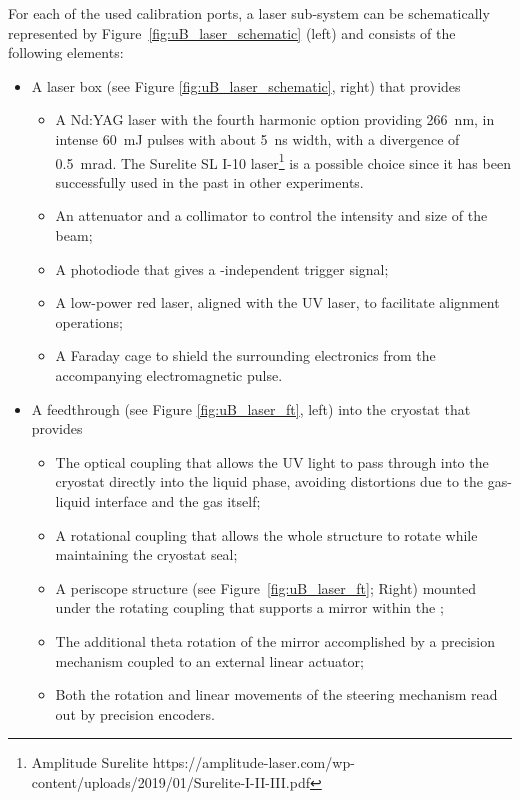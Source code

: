 For each of %
the used calibration ports, a laser sub-system can be schematically represented by Figure~\ref{fig:uB_laser_schematic} (left) and consists of the following elements:
\begin{itemize}
    \item A laser box (see Figure \ref{fig:uB_laser_schematic}, right) that provides
    \begin{itemize}
        \item A Nd:YAG laser with the fourth harmonic option providing \SI{266}{\nano\m}, in intense \SI{60}{\milli\joule} pulses with about \SI{5}{\nano\s} width, with a divergence of \SI{0.5}{\milli\radian}. The Surelite SL I-10 laser\footnote{Amplitude Surelite\texttrademark{} https://amplitude-laser.com/wp-content/uploads/2019/01/Surelite-I-II-III.pdf} is a possible choice since it has been successfully used in the past in other experiments.
        \item An attenuator and a collimator to control the intensity and size of the beam;
        \item A photodiode that gives a -independent trigger signal;
        \item A low-power red laser, aligned with the UV laser, to facilitate alignment operations;
        \item A Faraday cage to shield the surrounding electronics from the accompanying electromagnetic pulse. %
    \end{itemize}
    \item A feedthrough (see Figure \ref{fig:uB_laser_ft}, left) into the cryostat that provides
    \begin{itemize}
        \item The optical coupling that allows the UV light to pass through into the cryostat directly into the liquid phase, avoiding distortions due to the gas-liquid interface and the gas itself;
        \item A rotational coupling that allows the whole structure to rotate while maintaining the cryostat seal;
        \item A periscope structure (see Figure~\ref{fig:uB_laser_ft}; Right) mounted under the rotating coupling that supports a mirror within the ;
        \item The additional theta rotation of the mirror accomplished by a precision mechanism coupled to an external linear actuator;
        \item Both the rotation and linear movements of the steering mechanism read out by precision encoders.
    \end{itemize}
    
\end{itemize}

